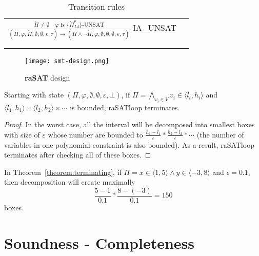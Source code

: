 \begin{table*}[t]
\begin{tabular}{ll}
  \large 
  $\frac{\mathring{\Pi} \not= \emptyset \quad \varphi \text{ is }  \{\mathring{\Pi}^p_{IA}\}\text{-UNSAT}}{(\Pi, \varphi, \mathring{\Pi}, \emptyset, \emptyset, \varepsilon, \tau) \to (\Pi \wedge \neg\mathring{\Pi}, \varphi, \emptyset, \emptyset, \emptyset, \varepsilon, \tau)}$ \tiny IA\_UNSAT \\\\
  \hline\\
  \end{tabular}
  \caption{Transition rules}\label{tab:transition-rules}
\end{table*}

\begin{figure}[ht]
\centering
\texttt{[image: smt-design.png]} 
\caption{\textbf{raSAT} design} 
\label{fig:smt-design} 
\end{figure}

\begin{theorem} \label{theorem:terminating}
Starting with state ${(\Pi, \varphi, \emptyset, \emptyset, \varepsilon, \bot)}$, if $\Pi = \bigwedge\limits_{v_i \in V} v_i \in \langle l_i, h_i \rangle$ and ${\langle l_1, h_1 \rangle \times \langle l_2, h_2 \rangle \times \cdots}$ is bounded, raSATloop terminates.
\end{theorem}

\begin{proof}
In the worst case, all the interval will be decomposed into smallest boxes with size of $\varepsilon$ whose number are bounded to $\frac{h_1 - l_1}{\varepsilon}*\frac{h_2 - l_2}{\varepsilon}*\cdots$ (the number of variables in one polynomial constraint is also bounded). As a result, raSATloop terminates after checking all of these boxes.
\end{proof}

\begin{example}
In Theorem~\ref{theorem:terminating}, if $\Pi= x \in \langle 1, 5 \rangle \wedge y \in \langle -3, 8 \rangle$ and $\epsilon = 0.1$, then decomposition will create maximally \[\frac{5 - 1}{0.1}*\frac{8 - (-3)}{0.1} = 150\] boxes.
\end{example}

\section{Soundness - Completeness}
